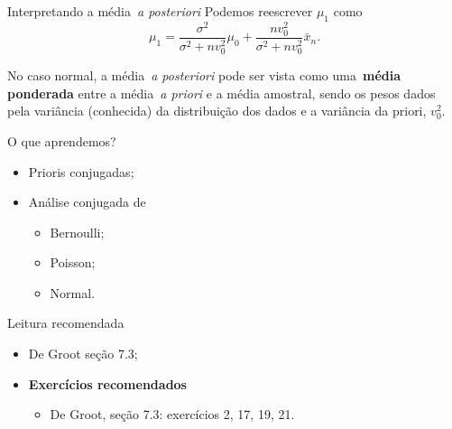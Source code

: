 \begin{frame}{Interpretando a média~\textit{a posteriori}}
 Podemos reescrever $\mu_1$ como
 \begin{equation}
  \mu_1 = \frac{\sigma^2}{\sigma^2 + nv_0^2}\mu_0 + \frac{nv_0^2}{\sigma^2 + nv_0^2}\bar{x}_n.
 \end{equation}
\begin{obs}
 No caso normal, a média~\textit{a posteriori} pode ser vista como uma~\textbf{média ponderada} entre a média~\textit{a priori} e a média amostral, sendo os pesos dados pela variância (conhecida) da distribuição dos dados e a variância da priori, $v_0^2$.
\end{obs}
\end{frame}

\begin{frame}{O que aprendemos?}
 \begin{itemize}
  \item[\faLightbulbO] Prioris conjugadas;
  \item[\faLightbulbO] Análise conjugada de
  \begin{itemize}
   \item Bernoulli;
   \item Poisson;
   \item Normal.
  \end{itemize}
 \end{itemize}
\end{frame}

\begin{frame}{Leitura recomendada}
\begin{itemize}
 \item[\faBook] De Groot seção 7.3;
 \item {\large\textbf{Exercícios recomendados}}
 \begin{itemize}
  \item[\faBookmark] De Groot, seção 7.3: exercícios 2, 17, 19, 21. 
  \end{itemize}
 \end{itemize} 
\end{frame}
